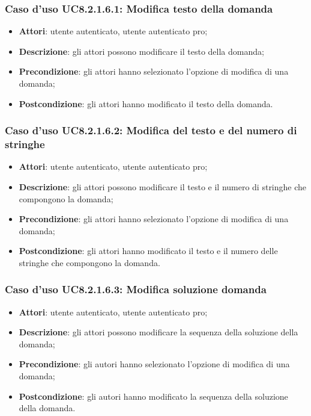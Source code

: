\subsubsection{Caso d'uso UC8.2.1.6.1: Modifica testo della domanda}
\begin{itemize}
	\item \textbf{Attori}: utente autenticato, utente autenticato pro;
	\item \textbf{Descrizione}: gli attori possono modificare il testo della domanda;
	\item \textbf{Precondizione}: gli attori hanno selezionato l'opzione di modifica di una domanda;
	\item \textbf{Postcondizione}: gli attori hanno modificato il testo della domanda.
\end{itemize}

\subsubsection{Caso d'uso UC8.2.1.6.2: Modifica del testo e del numero di stringhe}
\begin{itemize}
	\item \textbf{Attori}: utente autenticato, utente autenticato pro;
	\item \textbf{Descrizione}: gli attori possono modificare il testo e il numero di stringhe che compongono la domanda;
	\item \textbf{Precondizione}: gli attori hanno selezionato l'opzione di modifica di una domanda;
	\item \textbf{Postcondizione}: gli attori hanno modificato il testo e il numero delle stringhe che compongono la domanda.
\end{itemize}

\subsubsection{Caso d'uso UC8.2.1.6.3: Modifica soluzione domanda}
\begin{itemize}
	\item \textbf{Attori}: utente autenticato, utente autenticato pro;
	\item \textbf{Descrizione}: gli attori possono modificare la sequenza della soluzione della domanda;
	\item \textbf{Precondizione}: gli autori hanno selezionato l'opzione di modifica di una domanda;
	\item \textbf{Postcondizione}: gli autori hanno modificato la sequenza della soluzione della domanda. 
\end{itemize}